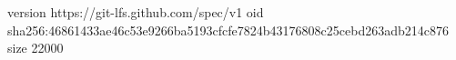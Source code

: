 version https://git-lfs.github.com/spec/v1
oid sha256:46861433ae46c53e9266ba5193cfcfe7824b43176808c25cebd263adb214c876
size 22000
